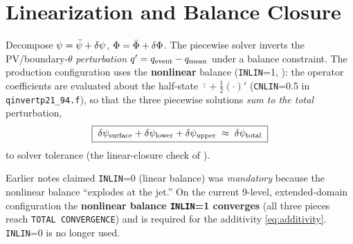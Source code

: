 \section{Linearization and Balance Closure}
\label{sec:closure}

Decompose $\psi=\bar{\psi}+\delta\psi$, $\Phi=\bar{\Phi}+\delta\Phi$.  The piecewise solver
inverts the PV/boundary-$\theta$ \emph{perturbation}
$q^{\prime}=q_{\text{event}}-q_{\text{mean}}$ under a balance constraint.  The
production configuration uses the \textbf{nonlinear} balance
(\texttt{INLIN}=1, ): the operator coefficients are
evaluated about the half-state $\bar\cdot + \tfrac12(\cdot)'$
(\texttt{CNLIN}=0.5 in \texttt{qinvertp21\_94.f}), so that the three
piecewise solutions \emph{sum to the total} perturbation,
\begin{equation}
\boxed{\;\delta\psi_{\text{surface}}+\delta\psi_{\text{lower}}+\delta\psi_{\text{upper}}
       \;\approx\;\delta\psi_{\text{total}}\;}
\label{eq:additivity}
\end{equation}
to solver tolerance (the linear-closure check of ).

\begin{warnbox}[Why INLIN=1 rather than INLIN=0]
Earlier notes claimed \texttt{INLIN}=0 (linear balance) was
\emph{mandatory} because the nonlinear balance ``explodes at the jet.''
On the current 9-level, extended-domain configuration the
\textbf{nonlinear balance \texttt{INLIN}=1 converges} (all three pieces
reach \texttt{TOTAL CONVERGENCE}) and is required for the additivity
\cref{eq:additivity}.  \texttt{INLIN}=0 is no longer used.
\end{warnbox}
